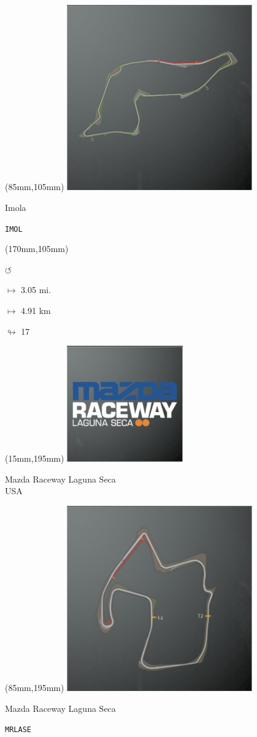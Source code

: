 \begin{textblock*}{80mm}(85mm,105mm)%
\includegraphics[width=80mm]{TR/2015-05-20_00030.png}
\centerline{Imola}
\par\hfill\tiny\tt IMOL\\
\end{textblock*}
\begin{textblock*}{30mm}(170mm,105mm)%
\par \Huge$\circlearrowleft$
\Large
\par$\mapsto$ 3.05 mi.
\par$\mapsto$ 4.91 km
\par$\looparrowright$ 17
\end{textblock*}
\begin{textblock*}{60mm}(15mm,195mm)%
\includegraphics[width=50mm]{LG/2015-05-20_00085.png}
\par Mazda Raceway Laguna Seca\\ USA
\end{textblock*}
\begin{textblock*}{80mm}(85mm,195mm)%
\includegraphics[width=80mm]{TR/2015-05-21_00001.png}
\centerline{Mazda Raceway Laguna Seca}
\par\hfill\tiny\tt MRLASE\\
\end{textblock*}
